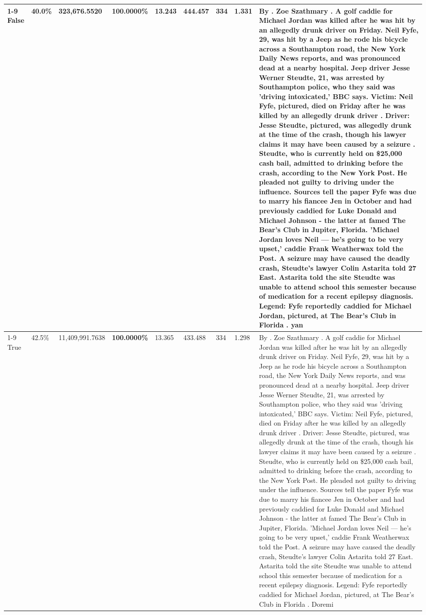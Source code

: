 \begin{table}[H]
\begin{tabular}{lllrlllll}
\cline{1-9}
False & 40.0\% & 323,676.5520 & \bfseries \color{red} 100.0000\% & 13.243 & 444.457 & 334 & 1.331 & By . Zoe Szathmary . A golf caddie for Michael Jordan was killed after he was hit by an allegedly drunk driver on Friday. Neil Fyfe, 29, was hit by a Jeep as he rode his bicycle across a Southampton road, the New York Daily News reports, and was pronounced dead at a nearby hospital. Jeep driver Jesse Werner Steudte, 21, was arrested by Southampton police, who they said was 'driving intoxicated,' BBC says. Victim: Neil Fyfe, pictured, died on Friday after he was killed by an allegedly drunk driver . Driver: Jesse Steudte, pictured, was allegedly drunk at the time of the crash, though his lawyer claims it may have been caused by a seizure . Steudte, who is currently held on \$25,000 cash bail, admitted to drinking before the crash, according to the New York Post. He pleaded not guilty to driving under the influence. Sources tell the paper Fyfe was due to marry his fiancee Jen in October and had previously caddied for Luke Donald and Michael Johnson - the latter at famed The Bear's Club in Jupiter, Florida. 'Michael Jordan loves Neil — he’s going to be very upset,' caddie Frank Weatherwax told the Post. A seizure may have caused the deadly crash, Steudte's lawyer Colin Astarita told 27 East. Astarita told the site Steudte was unable to attend school this semester because of medication for a recent epilepsy diagnosis. Legend: Fyfe reportedly caddied for Michael Jordan, pictured, at The Bear's Club in Florida . yan \\
\cline{1-9}
True & 42.5\% & 11,409,991.7638 & \bfseries \color{red} 100.0000\% & 13.365 & 433.488 & 334 & 1.298 & By . Zoe Szathmary . A golf caddie for Michael Jordan was killed after he was hit by an allegedly drunk driver on Friday. Neil Fyfe, 29, was hit by a Jeep as he rode his bicycle across a Southampton road, the New York Daily News reports, and was pronounced dead at a nearby hospital. Jeep driver Jesse Werner Steudte, 21, was arrested by Southampton police, who they said was 'driving intoxicated,' BBC says. Victim: Neil Fyfe, pictured, died on Friday after he was killed by an allegedly drunk driver . Driver: Jesse Steudte, pictured, was allegedly drunk at the time of the crash, though his lawyer claims it may have been caused by a seizure . Steudte, who is currently held on \$25,000 cash bail, admitted to drinking before the crash, according to the New York Post. He pleaded not guilty to driving under the influence. Sources tell the paper Fyfe was due to marry his fiancee Jen in October and had previously caddied for Luke Donald and Michael Johnson - the latter at famed The Bear's Club in Jupiter, Florida. 'Michael Jordan loves Neil — he’s going to be very upset,' caddie Frank Weatherwax told the Post. A seizure may have caused the deadly crash, Steudte's lawyer Colin Astarita told 27 East. Astarita told the site Steudte was unable to attend school this semester because of medication for a recent epilepsy diagnosis. Legend: Fyfe reportedly caddied for Michael Jordan, pictured, at The Bear's Club in Florida . Doremi \\

\end{tabular}
\end{table}
